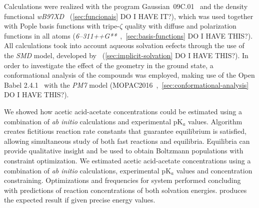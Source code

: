 Calculations were realized with the program Gaussian~09C.01~\cite{g09}
and the density functional
\emph{wB97XD}~\cite{Chai_2008a,Chai_2008b} (\cref{sec:funcionais} DO I HAVE IT?),
which was used together with Pople basis functions with tripe-$\zeta$ quality
with diffuse and polarization functions in all atoms
(\emph{6--311++G**}~\cite{Ditchfield_1971,Hehre_1972,Hariharan_1973,Hariharan_1974,Gordon_1980,Francl_1982,Clark_1983,Frisch_1984,Binning_1990,Blaudeau_1997,Rassolov_1998,Rassolov_2001},~\cref{sec:basis-functions} DO I HAVE THIS?).
All calculations took into account aqueous solvation eefects through the use of the \emph{SMD} model,
developed by~\citeauthor{Marenich_2009} (\cref{sec:implicit-solvation} DO I HAVE THIS?).
In order to investigate the effect of the geometry in the ground state,
a conformational analysis of the compounds was employed,
making use of the Open Babel 2.4.1~\cite{O_Boyle_2011}
with the \emph{PM7} model (MOPAC2016~\cite{MOPAC},~\cref{sec:conformational-analysis} DO I HAVE THIS?).


We showed how
acetic acid-acetate concentrations could be estimated using a combination of \emph{ab initio} calculations and experimental pK$_a$ values.
Algorithm creates fictitious reaction rate constants that guarantee equilibrium is satisfied,
allowing simultaneous study of both fast reactions and equilibria.
Equilibria can provide qualitative insight and be used to obtain Boltzmann populations with constraint optimization.
We estimated acetic acid-acetate concentrations using a combination of \emph{ab initio} calculations,
experimental pK$_a$ values and  concentration constraining.
Optimizations and frequencies for  system performed concluding with predictions of reaction concentrations of both solvation energies.
\overreact{} produces the expected result if given precise energy values.


